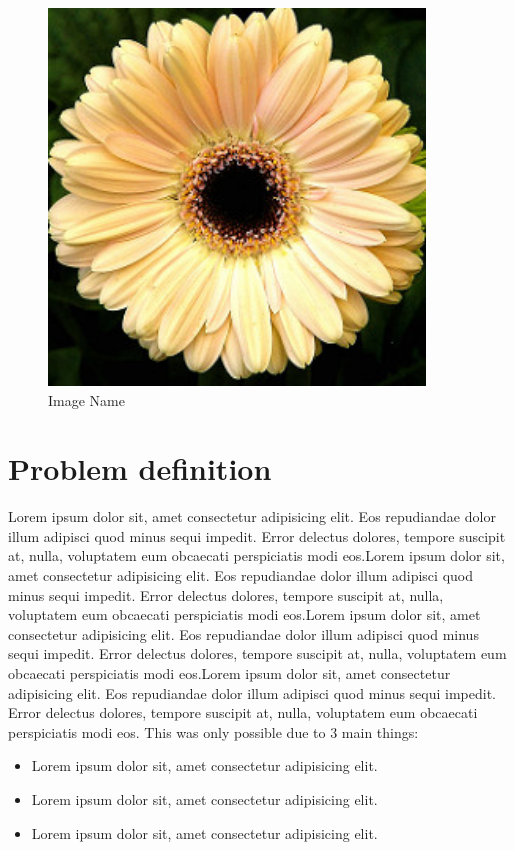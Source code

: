   \begin{figure}[H]
  \centering
  \includegraphics[width=10cm]{img/daisy}
  \caption[Image Name]{Image Name}\label{learningsteps}
\end{figure}

\section{Problem definition}

Lorem ipsum dolor sit, amet consectetur adipisicing elit. Eos repudiandae dolor illum adipisci quod minus sequi impedit. Error delectus dolores, tempore suscipit at, nulla, voluptatem eum obcaecati perspiciatis modi eos.Lorem ipsum dolor sit, amet consectetur adipisicing elit. Eos repudiandae dolor illum adipisci quod minus sequi impedit. Error delectus dolores, tempore suscipit at, nulla, voluptatem eum obcaecati perspiciatis modi eos.Lorem ipsum dolor sit, amet consectetur adipisicing elit. Eos repudiandae dolor illum adipisci quod minus sequi impedit. Error delectus dolores, tempore suscipit at, nulla, voluptatem eum obcaecati perspiciatis modi eos.Lorem ipsum dolor sit, amet consectetur adipisicing elit. Eos repudiandae dolor illum adipisci quod minus sequi impedit. Error delectus dolores, tempore suscipit at, nulla, voluptatem eum obcaecati perspiciatis modi eos. This was only possible due to 3 main things:

\begin{itemize}
  \item Lorem ipsum dolor sit, amet consectetur adipisicing elit. 
  \item Lorem ipsum dolor sit, amet consectetur adipisicing elit. 
  \item Lorem ipsum dolor sit, amet consectetur adipisicing elit. 
\end{itemize}

